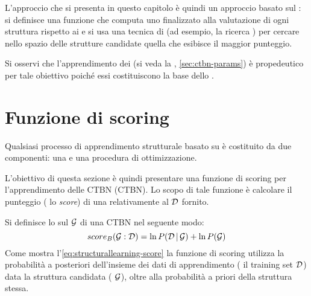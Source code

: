 L'approccio che si presenta in questo capitolo è quindi un approccio basato sul : si definisce una funzione che computa uno \emph{} finalizzato alla valutazione di ogni struttura rispetto ai  e si usa una tecnica di  (ad esempio, la ricerca \emph{}) per cercare nello spazio delle strutture candidate quella che esibisce il maggior punteggio.

Si osservi che l'apprendimento dei  (si veda la , \autoref{sec:ctbn-params}) è propedeutico per tale obiettivo poiché essi costituiscono la base dello .

\cleardoublepage
\section{Funzione di scoring}\label{sec:ctbn-structurallearning-score}
Qualsiasi processo di apprendimento strutturale basato su  è costituito da due componenti: una \emph{} e una procedura di ottimizzazione.

L'obiettivo di questa sezione è quindi presentare una funzione di scoring per l'apprendimento  delle \acl{CTBN} (\acs{CTBN}). Lo scopo di tale funzione è calcolare il punteggio (\ie{} lo \emph{score}) di una  relativamente al \emph{} $\mathcal{D}$ fornito.

Si definisce lo \emph{} sul  $\mathcal{G}$ di una \acs{CTBN} nel seguente modo:
\begin{equation}\label{eq:structurallearning-score}
score_B(\mathcal{G}:\mathcal{D})=\ln{P(\mathcal{D}\,\arrowvert\,\mathcal{G})} + \ln{P(\mathcal{G})}
\end{equation}
Come mostra l'\autoref{eq:structurallearning-score} la funzione di scoring utilizza la probabilità a posteriori dell'insieme dei dati di apprendimento (\ie{} il training set $\mathcal{D}$) data la struttura candidata (\ie{} $\mathcal{G}$), oltre alla probabilità a priori della struttura stessa.

